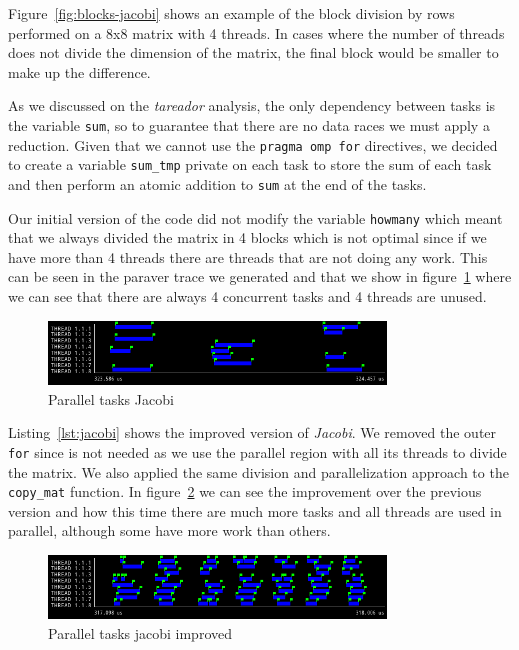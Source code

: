 Figure~\ref{fig:blocks-jacobi} shows an example of the block division by rows performed on a 8x8 matrix
with 4 threads. In cases where the number of threads does not divide the dimension of the matrix, the final
block would be smaller to make up the difference.

As we discussed on the \emph{tareador} analysis, the only dependency between tasks is the variable
\texttt{sum}, so to guarantee that there are no data races we must apply a reduction. Given that we cannot use
the \texttt{pragma omp for} directives, we decided to create a variable \texttt{sum_tmp} private on each
task to store the sum of each task and then perform an atomic addition to \texttt{sum} at the end of the tasks.

Our initial version of the code did not modify the variable \texttt{howmany} which meant that we always
divided the matrix in 4 blocks which is not optimal since if we have more than 4 threads there are threads
that are not doing any work. This can be seen in the paraver trace we generated and that we show in
figure~\ref{fig:trace-jacobi0} where we can see that there are always 4 concurrent tasks and 4 threads are unused.

\begin{figure}[H]
    \centering
    \includegraphics[width=0.8\textwidth]{jacobi_0_tasks}
    \caption{Parallel tasks Jacobi}%
    \label{fig:trace-jacobi0}
\end{figure}

Listing~\ref{lst:jacobi} shows the improved version of \emph{Jacobi}. We removed the outer \texttt{for}
since is not needed as we use the parallel region with all its threads to divide the matrix. We also
applied the same division and parallelization approach to the \texttt{copy\_mat} function.
In figure~\ref{fig:trace-jacobi1} we can see the improvement over the previous version and how this time
there are much more tasks and all threads are used in parallel, although some have more work than others.

\begin{figure}[H]
    \centering
    \includegraphics[width=0.8\textwidth]{jacobi_1_tasks}
    \caption{Parallel tasks jacobi improved}%
    \label{fig:trace-jacobi1}
\end{figure}

